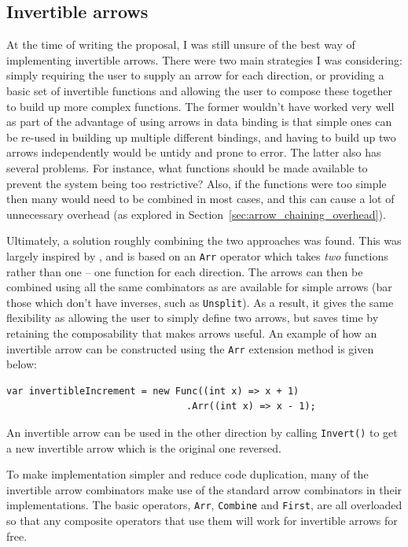 \documentclass[12pt,twoside,notitlepage]{report}
\begin{document}
\subsection{Invertible arrows}

At the time of writing the proposal, I was still unsure of the best way of implementing invertible arrows. There were two main strategies I was considering: simply requiring the user to supply an arrow for each direction, or providing a basic set of invertible functions and allowing the user to compose these together to build up more complex functions. The former wouldn't have worked very well as part of the advantage of using arrows in data binding is that simple ones can be re-used in building up multiple different bindings, and having to build up two arrows independently would be untidy and prone to error. The latter also has several problems. For instance, what functions should be made available to prevent the system being too restrictive? Also, if the functions were too simple then many would need to be combined in most cases, and this can cause a lot of unnecessary overhead (as explored in Section~\ref{sec:arrow_chaining_overhead}).

Ultimately, a solution roughly combining the two approaches was found. This was largely inspired by \cite{invertible_arrows}, and is based on an \texttt{Arr} operator which takes \textit{two} functions rather than one -- one function for each direction. The arrows can then be combined using all the same combinators as are available for simple arrows (bar those which don't have inverses, such as \texttt{Unsplit}). As a result, it gives the same flexibility as allowing the user to simply define two arrows, but saves time by retaining the composability that makes arrows useful. An example of how an invertible arrow can be constructed using the \texttt{Arr} extension method is given below:

\begin{lstlisting}[language={[Sharp]C}]
var invertibleIncrement = new Func((int x) => x + 1)
                                .Arr((int x) => x - 1);
\end{lstlisting}

An invertible arrow can be used in the other direction by calling \texttt{Invert()} to get a new invertible arrow which is the original one reversed.

To make implementation simpler and reduce code duplication, many of the invertible arrow combinators make use of the standard arrow combinators in their implementations. The basic operators, \texttt{Arr}, \texttt{Combine} and \texttt{First}, are all overloaded so that any composite operators that use them will work for invertible arrows for free.
\end{document}
